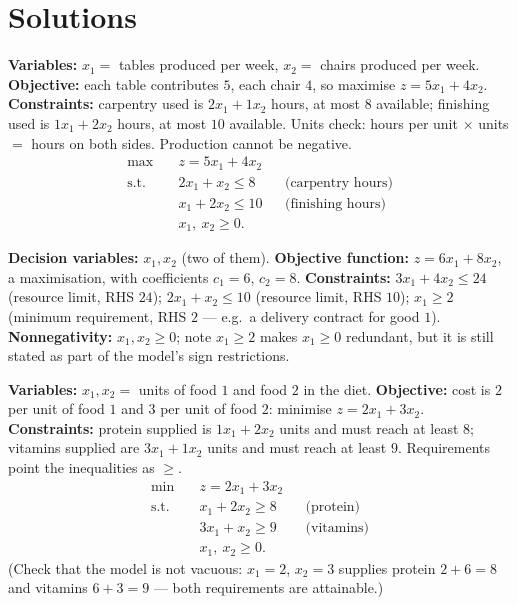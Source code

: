 \section{Solutions}

\begin{solutions}
  \item \textbf{Variables:} $x_1=$ tables produced per week, $x_2=$ chairs
        produced per week.
        \textbf{Objective:} each table contributes $5$, each chair $4$, so
        maximise $z=5x_1+4x_2$.
        \textbf{Constraints:} carpentry used is $2x_1+1x_2$ hours, at most
        $8$ available; finishing used is $1x_1+2x_2$ hours, at most $10$
        available. Units check: hours per unit $\times$ units $=$ hours on
        both sides. Production cannot be negative.
        \[
          \begin{aligned}
            \max\quad & z=5x_1+4x_2\\
            \text{s.t.}\quad & 2x_1+x_2\le 8 &&\text{(carpentry hours)}\\
            & x_1+2x_2\le 10 &&\text{(finishing hours)}\\
            & x_1,\ x_2\ge 0 .
          \end{aligned}
        \]

  \item \textbf{Decision variables:} $x_1,x_2$ (two of them).
        \textbf{Objective function:} $z=6x_1+8x_2$, a maximisation, with
        coefficients $c_1=6$, $c_2=8$.
        \textbf{Constraints:} $3x_1+4x_2\le 24$ (resource limit, RHS
        $24$); $2x_1+x_2\le 10$ (resource limit, RHS $10$); $x_1\ge 2$
        (minimum requirement, RHS $2$ — e.g.\ a delivery contract for
        good $1$).
        \textbf{Nonnegativity:} $x_1,x_2\ge 0$; note $x_1\ge 2$ makes
        $x_1\ge 0$ redundant, but it is still stated as part of the
        model's sign restrictions.

  \item \textbf{Variables:} $x_1,x_2=$ units of food $1$ and food $2$ in
        the diet.
        \textbf{Objective:} cost is $2$ per unit of food $1$ and $3$ per
        unit of food $2$: minimise $z=2x_1+3x_2$.
        \textbf{Constraints:} protein supplied is $1x_1+2x_2$ units and
        must reach at least $8$; vitamins supplied are $3x_1+1x_2$ units
        and must reach at least $9$. Requirements point the inequalities
        as $\ge$.
        \[
          \begin{aligned}
            \min\quad & z=2x_1+3x_2\\
            \text{s.t.}\quad & x_1+2x_2\ge 8 &&\text{(protein)}\\
            & 3x_1+x_2\ge 9 &&\text{(vitamins)}\\
            & x_1,\ x_2\ge 0 .
          \end{aligned}
        \]
        (Check that the model is not vacuous: $x_1=2$, $x_2=3$ supplies
        protein $2+6=8$ and vitamins $6+3=9$ — both requirements are
        attainable.)


\end{solutions}
